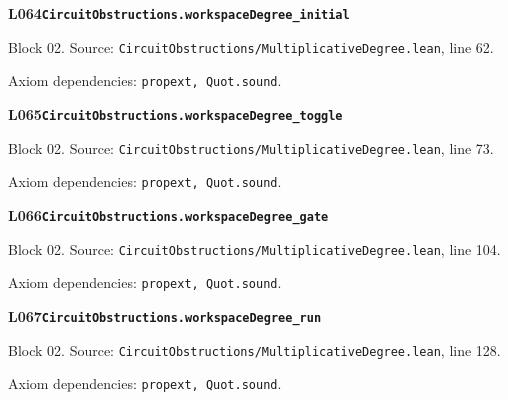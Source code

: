 \begin{minipage}{\linewidth}
\hypertarget{L064}{}
{\small\sffamily\bfseries\color{ink}L064\quad\nolinkurl{CircuitObstructions.workspaceDegree_initial}}\par
{\scriptsize\sffamily\color{muted}Block 02. Source: \nolinkurl{CircuitObstructions/MultiplicativeDegree.lean}, line 62.}\par
{}
{\scriptsize\sffamily\color{muted}Axiom dependencies: \nolinkurl{propext, Quot.sound}.}
\end{minipage}\par\medskip
\begin{minipage}{\linewidth}
\hypertarget{L065}{}
{\small\sffamily\bfseries\color{ink}L065\quad\nolinkurl{CircuitObstructions.workspaceDegree_toggle}}\par
{\scriptsize\sffamily\color{muted}Block 02. Source: \nolinkurl{CircuitObstructions/MultiplicativeDegree.lean}, line 73.}\par
{}
{\scriptsize\sffamily\color{muted}Axiom dependencies: \nolinkurl{propext, Quot.sound}.}
\end{minipage}\par\medskip
\begin{minipage}{\linewidth}
\hypertarget{L066}{}
{\small\sffamily\bfseries\color{ink}L066\quad\nolinkurl{CircuitObstructions.workspaceDegree_gate}}\par
{\scriptsize\sffamily\color{muted}Block 02. Source: \nolinkurl{CircuitObstructions/MultiplicativeDegree.lean}, line 104.}\par
{}
{\scriptsize\sffamily\color{muted}Axiom dependencies: \nolinkurl{propext, Quot.sound}.}
\end{minipage}\par\medskip
\begin{minipage}{\linewidth}
\hypertarget{L067}{}
{\small\sffamily\bfseries\color{ink}L067\quad\nolinkurl{CircuitObstructions.workspaceDegree_run}}\par
{\scriptsize\sffamily\color{muted}Block 02. Source: \nolinkurl{CircuitObstructions/MultiplicativeDegree.lean}, line 128.}\par
{}
{\scriptsize\sffamily\color{muted}Axiom dependencies: \nolinkurl{propext, Quot.sound}.}
\end{minipage}\par\medskip
